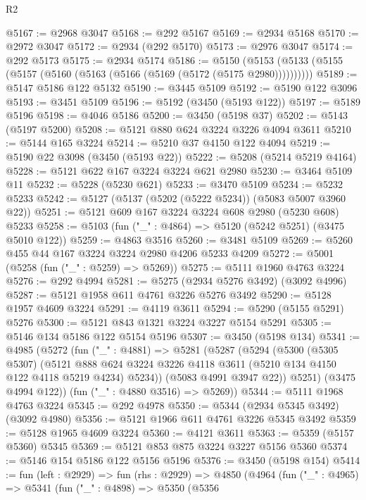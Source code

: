 \begin{lexlean}{R2}
\begin{coremodule}
@5167 := @2968 @3047
@5168 := @292 @5167
@5169 := @2934 @5168
@5170 := @2972 @3047
@5172 := @2934 (@292 @5170)
@5173 := @2976 @3047
@5174 := @292 @5173
@5175 := @2934 @5174
@5186 := @5150 (@5153 (@5133 (@5155 (@5157 (@5160 (@5163 (@5166 (@5169 (@5172 (@5175 @2980))))))))))
@5189 := @5147 @5186 @122 @5132
@5190 := @3445 @5109
@5192 := @5190 @122 @3096
@5193 := @3451 @5109
@5196 := @5192 (@3450 (@5193 @122))
@5197 := @5189 @5196
@5198 := @4046 @5186
@5200 := @3450 (@5198 @37)
@5202 := @5143 (@5197 @5200)
@5208 := @5121 @880 @624 @3224 @3226 @4094 @3611
@5210 := @5144 @165 @3224
@5214 := @5210 @37 @4150 @122 @4094
@5219 := @5190 @22 @3098 (@3450 (@5193 @22))
@5222 := @5208 (@5214 @5219 @4164)
@5228 := @5121 @622 @167 @3224 @3224 @621 @2980
@5230 := @3464 @5109 @11
@5232 := @5228 (@5230 @621)
@5233 := @3470 @5109
@5234 := @5232 @5233
@5242 := @5127 (@5137 (@5202 (@5222 @5234)) (@5083 @5007 @3960 @22))
@5251 := @5121 @609 @167 @3224 @3224 @608 @2980 (@5230 @608) @5233
@5258 := @5103 (fun ("_" : @4864) => @5120 (@5242 @5251) (@3475 @5010 @122))
@5259 := @4863 @3516
@5260 := @3481 @5109
@5269 := @5260 @455 @44 @167 @3224 @3224 @2980 @4206 @5233 @4209
@5272 := @5001 (@5258 (fun ("_" : @5259) => @5269))
@5275 := @5111 @1960 @4763 @3224
@5276 := @292 @4994
@5281 := @5275 (@2934 @5276 @3492) (@3092 @4996)
@5287 := @5121 @1958 @611 @4761 @3226 @5276 @3492
@5290 := @5128 @1957 @4609 @3224
@5291 := @4119 @3611
@5294 := @5290 (@5155 @5291) @5276
@5300 := @5121 @843 @1321 @3224 @3227 @5154 @5291
@5305 := @5146 @134 @5186 @122 @5154 @5196
@5307 := @3450 (@5198 @134)
@5341 := @4985
    (@5272
      (fun ("_" : @4881) =>
      @5281
        (@5287
          (@5294
            (@5300
              (@5305 @5307)
              (@5121
                @888
                @624
                @3224
                @3226
                @4118
                @3611
                (@5210 @134 @4150 @122 @4118 @5219 @4234)
                @5234))
            (@5083 @4991 @3947 @22))
          @5251)
        (@3475 @4994 @122))
      (fun ("_" : @4880 @3516) => @5269))
@5344 := @5111 @1968 @4763 @3224
@5345 := @292 @4978
@5350 := @5344 (@2934 @5345 @3492) (@3092 @4980)
@5356 := @5121 @1966 @611 @4761 @3226 @5345 @3492
@5359 := @5128 @1965 @4609 @3224
@5360 := @4121 @3611
@5363 := @5359 (@5157 @5360) @5345
@5369 := @5121 @853 @875 @3224 @3227 @5156 @5360
@5374 := @5146 @154 @5186 @122 @5156 @5196
@5376 := @3450 (@5198 @154)
@5414 := fun (left : @2929) =>
  fun (rhs : @2929) =>
  @4850
    (@4964
      (fun ("_" : @4965) =>
      @5341
        (fun ("_" : @4898) =>
        @5350
          (@5356

\end{coremodule}
\end{lexlean}
